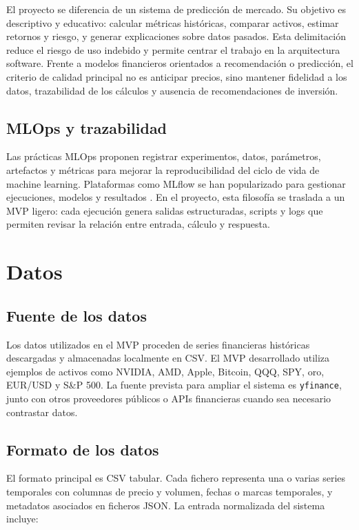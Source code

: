 \documentclass[11pt,a4paper]{article}
\let\oldsection\section
\renewcommand{\section}{\clearpage\oldsection}
\begin{document}
El proyecto se diferencia de un sistema de predicci\'on de mercado. Su objetivo es descriptivo y educativo: calcular m\'etricas hist\'oricas, comparar activos, estimar retornos y riesgo, y generar explicaciones sobre datos pasados. Esta delimitaci\'on reduce el riesgo de uso indebido y permite centrar el trabajo en la arquitectura software. Frente a modelos financieros orientados a recomendaci\'on o predicci\'on, el criterio de calidad principal no es anticipar precios, sino mantener fidelidad a los datos, trazabilidad de los c\'alculos y ausencia de recomendaciones de inversi\'on.

\subsection{MLOps y trazabilidad}

Las pr\'acticas MLOps proponen registrar experimentos, datos, par\'ametros, artefactos y m\'etricas para mejorar la reproducibilidad del ciclo de vida de machine learning. Plataformas como MLflow se han popularizado para gestionar ejecuciones, modelos y resultados \cite{mlflow}. En el proyecto, esta filosof\'ia se traslada a un MVP ligero: cada ejecuci\'on genera salidas estructuradas, scripts y logs que permiten revisar la relaci\'on entre entrada, c\'alculo y respuesta.

\section{Datos}

\subsection{Fuente de los datos}

Los datos utilizados en el MVP proceden de series financieras hist\'oricas descargadas y almacenadas localmente en CSV. El MVP desarrollado utiliza ejemplos de activos como NVIDIA, AMD, Apple, Bitcoin, QQQ, SPY, oro, EUR/USD y S\&P 500. La fuente prevista para ampliar el sistema es \texttt{yfinance}, junto con otros proveedores p\'ublicos o APIs financieras cuando sea necesario contrastar datos.

\subsection{Formato de los datos}

El formato principal es CSV tabular. Cada fichero representa una o varias series temporales con columnas de precio y volumen, fechas o marcas temporales, y metadatos asociados en ficheros JSON. La entrada normalizada del sistema incluye:
\end{document}
